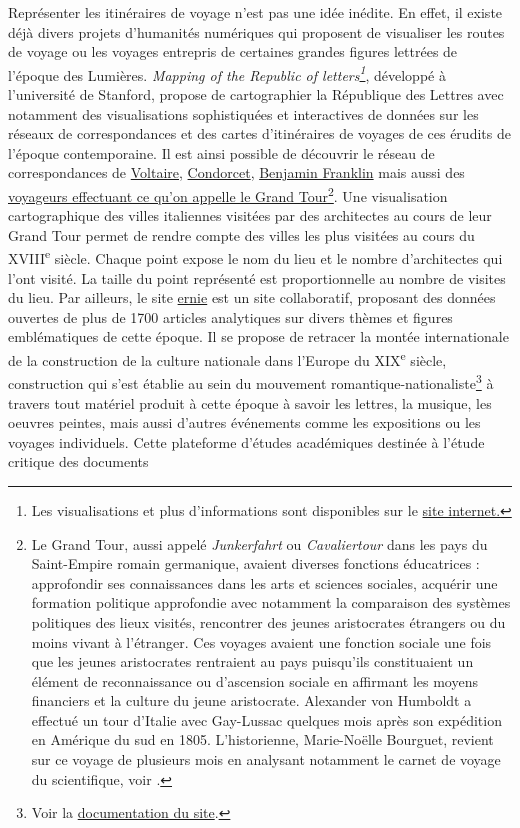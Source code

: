 \documentclass[a4paper, 12pt, twoside]{book}
\begin{document}
Représenter les itinéraires de voyage n'est pas une idée inédite. En effet, il existe déjà divers projets d'humanités numériques qui proposent de visualiser les routes de voyage ou les voyages entrepris de certaines grandes figures lettrées de l'époque des Lumières. \textit{Mapping of the Republic of letters\footnote{Les visualisations et plus d'informations sont disponibles sur le \href{http://republicofletters.stanford.edu/}{site internet.}}}, développé à l'université de Stanford, propose de cartographier la République des Lettres avec notamment des visualisations sophistiquées et interactives de données sur les réseaux de correspondances et des cartes d'itinéraires de voyages de ces érudits de l'époque contemporaine. Il est ainsi possible de découvrir le réseau de correspondances de \href{http://republicofletters.stanford.edu/casestudies/voltaire.html}{Voltaire}, \href{http://republicofletters.stanford.edu/casestudies/condorcet.html}{Condorcet}, \href{http://republicofletters.stanford.edu/casestudies/franklin.html}{Benjamin Franklin} mais aussi des \href{http://republicofletters.stanford.edu/casestudies/grandtour.html}{voyageurs effectuant ce qu'on appelle le Grand Tour\footnote{Le Grand Tour, aussi appelé \textit{Junkerfahrt} ou \textit{Cavaliertour} dans les pays du Saint-Empire romain germanique, avaient diverses fonctions éducatrices : approfondir ses connaissances dans les arts et sciences sociales, acquérir une formation politique approfondie avec notamment la comparaison des systèmes politiques des lieux visités, rencontrer des jeunes aristocrates étrangers ou du moins vivant à l'étranger. Ces voyages avaient une fonction sociale une fois que les jeunes aristocrates rentraient au pays puisqu'ils constituaient un élément de reconnaissance ou d'ascension sociale en affirmant les moyens financiers et la culture du jeune aristocrate. Alexander von Humboldt a effectué un tour d'Italie avec Gay-Lussac quelques mois après son expédition en Amérique du sud en 1805. L'historienne, Marie-Noëlle Bourguet, revient sur ce voyage de plusieurs mois en analysant notamment le carnet de voyage du scientifique, voir \cite{bourguet_monde_2017}.}}. Une visualisation cartographique des villes italiennes visitées par des architectes au cours de leur Grand Tour permet de rendre compte des villes les plus visitées au cours du XVIII\textsuperscript{e} siècle. Chaque point expose le nom du lieu et le nombre d'architectes qui l'ont visité. La taille du point représenté est proportionnelle au nombre de visites du lieu. Par ailleurs, le site \href{https://ernie.uva.nl/}{\gls{ernie}} est un site collaboratif, proposant des données ouvertes de plus de 1700 articles analytiques sur divers thèmes et figures emblématiques de cette époque. Il se propose de retracer la montée internationale de la construction de la culture nationale dans l'Europe du XIX\textsuperscript{e} siècle, construction qui s'est établie au sein du mouvement romantique-nationaliste\footnote{Voir la \href{https://ernie.uva.nl/viewer.p/21/56}{documentation du site}.} à travers tout matériel produit à cette époque à savoir les lettres, la musique, les oeuvres peintes, mais aussi d'autres événements comme les expositions ou les voyages individuels. Cette plateforme d'études académiques destinée à l'étude critique des documents 
\end{document}
